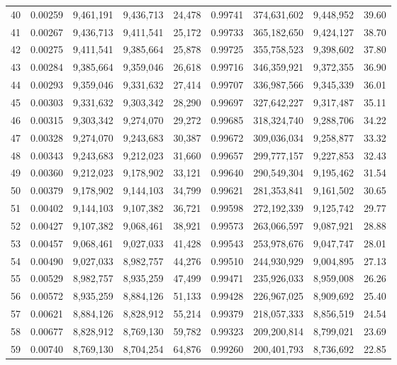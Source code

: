 \begin{longtable}{rrrrrrrrr}
40 & 0.00259 & 9,461,191 & 9,436,713 & 24,478 & 0.99741 & 374,631,602 & 9,448,952 & 39.60 \\
41 & 0.00267 & 9,436,713 & 9,411,541 & 25,172 & 0.99733 & 365,182,650 & 9,424,127 & 38.70 \\
42 & 0.00275 & 9,411,541 & 9,385,664 & 25,878 & 0.99725 & 355,758,523 & 9,398,602 & 37.80 \\
43 & 0.00284 & 9,385,664 & 9,359,046 & 26,618 & 0.99716 & 346,359,921 & 9,372,355 & 36.90 \\
44 & 0.00293 & 9,359,046 & 9,331,632 & 27,414 & 0.99707 & 336,987,566 & 9,345,339 & 36.01 \\
45 & 0.00303 & 9,331,632 & 9,303,342 & 28,290 & 0.99697 & 327,642,227 & 9,317,487 & 35.11 \\
46 & 0.00315 & 9,303,342 & 9,274,070 & 29,272 & 0.99685 & 318,324,740 & 9,288,706 & 34.22 \\
47 & 0.00328 & 9,274,070 & 9,243,683 & 30,387 & 0.99672 & 309,036,034 & 9,258,877 & 33.32 \\
48 & 0.00343 & 9,243,683 & 9,212,023 & 31,660 & 0.99657 & 299,777,157 & 9,227,853 & 32.43 \\
49 & 0.00360 & 9,212,023 & 9,178,902 & 33,121 & 0.99640 & 290,549,304 & 9,195,462 & 31.54 \\
50 & 0.00379 & 9,178,902 & 9,144,103 & 34,799 & 0.99621 & 281,353,841 & 9,161,502 & 30.65 \\
51 & 0.00402 & 9,144,103 & 9,107,382 & 36,721 & 0.99598 & 272,192,339 & 9,125,742 & 29.77 \\
52 & 0.00427 & 9,107,382 & 9,068,461 & 38,921 & 0.99573 & 263,066,597 & 9,087,921 & 28.88 \\
53 & 0.00457 & 9,068,461 & 9,027,033 & 41,428 & 0.99543 & 253,978,676 & 9,047,747 & 28.01 \\
54 & 0.00490 & 9,027,033 & 8,982,757 & 44,276 & 0.99510 & 244,930,929 & 9,004,895 & 27.13 \\
55 & 0.00529 & 8,982,757 & 8,935,259 & 47,499 & 0.99471 & 235,926,033 & 8,959,008 & 26.26 \\
56 & 0.00572 & 8,935,259 & 8,884,126 & 51,133 & 0.99428 & 226,967,025 & 8,909,692 & 25.40 \\
57 & 0.00621 & 8,884,126 & 8,828,912 & 55,214 & 0.99379 & 218,057,333 & 8,856,519 & 24.54 \\
58 & 0.00677 & 8,828,912 & 8,769,130 & 59,782 & 0.99323 & 209,200,814 & 8,799,021 & 23.69 \\
59 & 0.00740 & 8,769,130 & 8,704,254 & 64,876 & 0.99260 & 200,401,793 & 8,736,692 & 22.85 \\

\end{longtable}
